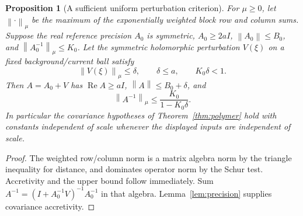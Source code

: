 \documentclass[11pt]{article}
\newtheorem{proposition}[theorem]{Proposition}
\theoremstyle{remark}
\newcommand{\Rea}{\operatorname{Re}}
\newcommand{\norm}[1]{\left\|#1\right\|}
\begin{document}
\begin{proposition}[A sufficient uniform perturbation criterion]
For $\mu\ge0$, let $\norm{\cdot}_\mu$ be the maximum of the exponentially weighted
block row and column sums. Suppose the real reference precision $A_0$
is symmetric, $A_0\ge2aI$, $\norm{A_0}\le B_0$, and
$\norm{A_0^{-1}}_\mu\le K_0$. Let the symmetric holomorphic
perturbation $V(\xi)$ on a fixed background/current ball satisfy
\[
 \norm{V(\xi)}_\mu\le\delta,\qquad
 \delta\le a,\qquad K_0\delta<1.
\]
Then $A=A_0+V$ has $\Rea A\ge aI$, $\norm A\le B_0+\delta$, and
\[
 \norm{A^{-1}}_\mu\le\frac{K_0}{1-K_0\delta}.
\]
In particular the covariance hypotheses of
Theorem~\ref{thm:polymer} hold with constants independent of scale
whenever the displayed inputs are independent of scale.
\end{proposition}

\begin{proof}
The weighted row/column norm is a matrix algebra norm by the triangle
inequality for distance, and dominates operator norm by the Schur
test. Accretivity and the upper bound follow immediately. Sum
$A^{-1}=(I+A_0^{-1}V)^{-1}A_0^{-1}$ in that algebra.
Lemma~\ref{lem:precision} supplies covariance accretivity.
\end{proof}
\end{document}
